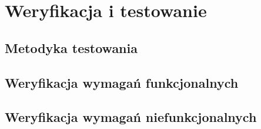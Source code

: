 \documentclass[12pt, a4paper, oneside]{report}
\begin{document}
\chapter{Weryfikacja i testowanie}
\label{chap:weryfikacja}


\section{Metodyka testowania}
\label{sec:metodyka}



\section{Weryfikacja wymagań funkcjonalnych}
\label{sec:wer-funk}

%


\section{Weryfikacja wymagań niefunkcjonalnych}
\label{sec:wer-niefunk}



\end{document}
